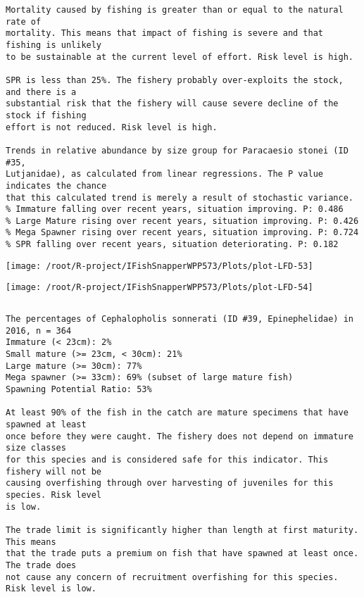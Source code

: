 \documentclass{report}\usepackage[]{graphicx}\usepackage[]{color}
\makeatletter
\def\maxwidth{ %
  \ifdim\Gin@nat@width>\linewidth
    \linewidth
  \else
    \Gin@nat@width
  \fi
}
\newenvironment{kframe}{%
 \def\at@end@of@kframe{}%
 \ifinner\ifhmode%
  \def\at@end@of@kframe{\end{minipage}}%
  \begin{minipage}{\columnwidth}%
 \fi\fi%
 \def\FrameCommand##1{\hskip\@totalleftmargin \hskip-\fboxsep
 \colorbox{shadecolor}{##1}\hskip-\fboxsep
     \hskip-\linewidth \hskip-\@totalleftmargin \hskip\columnwidth}%
 \MakeFramed {\advance\hsize-\width
   \@totalleftmargin\z@ \linewidth\hsize
   \@setminipage}}%
 {\par\unskip\endMakeFramed%
 \at@end@of@kframe}
\newenvironment{knitrout}{}{} %
\makeatother
\begin{document}
\begin{knitrout}
\begin{kframe}
\begin{verbatim}
Mortality caused by fishing is greater than or equal to the natural rate of
mortality. This means that impact of fishing is severe and that fishing is unlikely
to be sustainable at the current level of effort. Risk level is high.
 
SPR is less than 25%. The fishery probably over-exploits the stock, and there is a
substantial risk that the fishery will cause severe decline of the stock if fishing
effort is not reduced. Risk level is high.
 
Trends in relative abundance by size group for Paracaesio stonei (ID #35,
Lutjanidae), as calculated from linear regressions. The P value indicates the chance
that this calculated trend is merely a result of stochastic variance.
% Immature falling over recent years, situation improving. P: 0.486
% Large Mature rising over recent years, situation improving. P: 0.426
% Mega Spawner rising over recent years, situation improving. P: 0.724
% SPR falling over recent years, situation deteriorating. P: 0.182
\end{verbatim}
\end{kframe}
\texttt{[image: /root/R-project/IFishSnapperWPP573/Plots/plot-LFD-53]} 

\texttt{[image: /root/R-project/IFishSnapperWPP573/Plots/plot-LFD-54]} 
\begin{kframe}\begin{verbatim}
\end{verbatim}
\end{kframe}
\clearpage
\newpage
\begin{kframe}\begin{verbatim}The percentages of Cephalopholis sonnerati (ID #39, Epinephelidae) in 2016, n = 364
Immature (< 23cm): 2%
Small mature (>= 23cm, < 30cm): 21%
Large mature (>= 30cm): 77%
Mega spawner (>= 33cm): 69% (subset of large mature fish)
Spawning Potential Ratio: 53%
 
At least 90% of the fish in the catch are mature specimens that have spawned at least
once before they were caught. The fishery does not depend on immature size classes
for this species and is considered safe for this indicator. This fishery will not be
causing overfishing through over harvesting of juveniles for this species. Risk level
is low.

The trade limit is significantly higher than length at first maturity.  This means
that the trade puts a premium on fish that have spawned at least once. The trade does
not cause any concern of recruitment overfishing for this species. Risk level is low.


\end{verbatim}
\end{kframe}
\end{knitrout}
\end{document}
